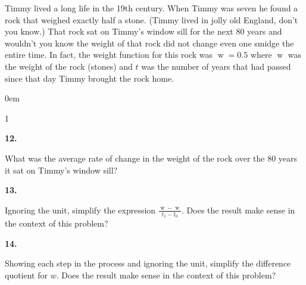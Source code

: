 \documentclass[12pt,]{book}
\theoremstyle{plain}
\theoremstyle{definition}
\numberwithin{equation}{section}
\newenvironment{exercisegroup}%
{\medskip\noindent}%
{\par\bigskip}%
\newlength{\exercisegroupindent}%
\newlength{\exercisegroupitemwidth}%
\newenvironment{exercisegrouplist}%
{\vspace{-\partopsep}%
\begin{adjustwidth}{\exercisegroupindent}{0em}}%
{\end{adjustwidth}%
\vspace{-\partopsep}%
\vspace{\baselineskip}}%
\newenvironment{exercisegroupbycol}[1]%
{\begin{exercisegrouplist}%
\vspace{-\multicolsep}%
\begin{multicols}{#1}%
\setlength{\parindent}{0em}%
\setlength{\exercisegroupitemwidth}{\linewidth}}%
{\end{multicols}%
\vspace{-\multicolsep}%
\end{exercisegrouplist}}%
\newenvironment{exercisegroupitem}[1]%
{\begin{minipage}[t]{\exercisegroupitemwidth}
\vspace{0pt}%
{\bfseries#1}%
\rule{0pt}{\baselineskip}}{\strut%
\end{minipage}%
\hspace{\columnsep}}%
\providecommand\phantomsection{}
\newcommand{\fe}[2]{\mathop{{#1}{\left(#2\right)}}}
\begin{document}
\begin{exercisegroup}%
Timmy lived a long life in the 19th century. When Timmy was seven he found a rock that weighed exactly half a stone. (Timmy lived in jolly old England, don't you know.) That rock sat on Timmy's window sill for the next 80 years and wouldn't you know the weight of that rock did not change even one smidge the entire time. In fact, the weight function for this rock was \(\fe{w}{t}=0.5\) where \(\fe{w}{t}\) was the weight of the rock (stones) and \(t\) was the number of years that had passed since that day Timmy brought the rock home.%
\begin{exercisegroupbycol}{1}%
\begin{exercisegroupitem}{12. }\phantomsection\hypertarget{exercise-20}{\null}
What was the average rate of change in the weight of the rock over the 80 years it sat on Timmy's window sill?%
\end{exercisegroupitem}%
\par%
\begin{exercisegroupitem}{13. }\phantomsection\hypertarget{exercise-21}{\null}
Ignoring the unit, simplify the expression \(\frac{\fe{w}{t_1}-\fe{w}{t_0}}{t_1-t_0}\). Does the result make sense in the context of this problem?%
\end{exercisegroupitem}%
\par%
\begin{exercisegroupitem}{14. }\phantomsection\hypertarget{exercise-22}{\null}
Showing each step in the process and ignoring the unit, simplify the difference quotient for \(w\). Does the result make sense in the context of this problem?%
\end{exercisegroupitem}%
\par%
\end{exercisegroupbycol}%
\end{exercisegroup}%
\end{document}
